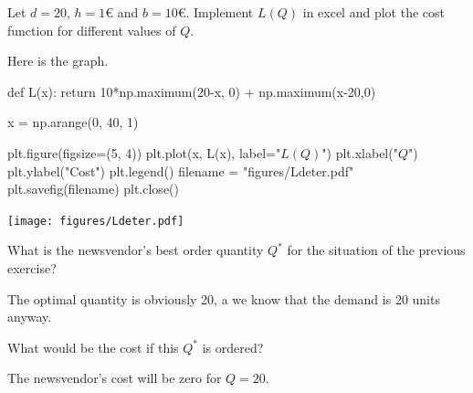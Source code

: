 \begin{exercise}\label{ex:nw_det}
Let $d=20$, $h=1$€ and $b=10$€. Implement $L(Q)$ in excel and plot the cost function for different values of $Q$. 
\begin{solution}

Here is the graph.
\begin{pycode}[news]
def L(x):
    return 10*np.maximum(20-x, 0) + np.maximum(x-20,0)

x = np.arange(0, 40, 1)

plt.figure(figsize=(5, 4))
plt.plot(x, L(x), label="$L(Q)$")
plt.xlabel("$Q$")
plt.ylabel("Cost")
plt.legend()
filename = "figures/Ldeter.pdf"
plt.savefig(filename)
plt.close()
\end{pycode}

\centering
\texttt{[image: figures/Ldeter.pdf]}
\end{solution}
\end{exercise}

\begin{exercise}
What is the newsvendor's best order quantity $Q^*$ for the situation of the previous exercise? 
\begin{solution}
The optimal quantity is obviously 20, a we know that the demand is 20 units anyway. 
\end{solution}
\end{exercise}

\begin{exercise}
What would be the cost if this $Q^*$ is ordered? 
\begin{solution}
The newsvendor's cost will be zero for $Q=20$. 
\end{solution}
\end{exercise}

